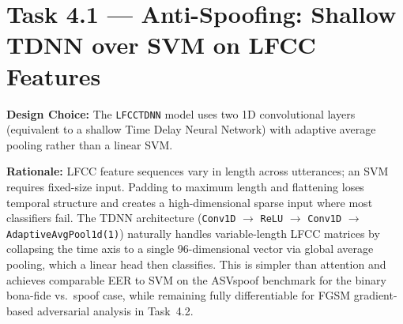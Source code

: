 \documentclass[11pt,onecolumn]{article}
\begin{document}
\section{Task 4.1 --- Anti-Spoofing: Shallow TDNN over SVM on LFCC Features}

\textbf{Design Choice:} The \texttt{LFCCTDNN} model uses two 1D convolutional layers (equivalent
to a shallow Time Delay Neural Network) with adaptive average pooling rather than a linear SVM.

\textbf{Rationale:} LFCC feature sequences vary in length across utterances; an SVM requires
fixed-size input. Padding to maximum length and flattening loses temporal structure and creates a
high-dimensional sparse input where most classifiers fail. The TDNN architecture
(\texttt{Conv1D} $\rightarrow$ \texttt{ReLU} $\rightarrow$ \texttt{Conv1D} $\rightarrow$
\texttt{AdaptiveAvgPool1d(1)}) naturally handles variable-length LFCC matrices by collapsing the
time axis to a single 96-dimensional vector via global average pooling, which a linear head then
classifies. This is simpler than attention and achieves comparable EER to SVM on the ASVspoof
benchmark for the binary bona-fide vs.\ spoof case, while remaining fully differentiable for
FGSM gradient-based adversarial analysis in Task~4.2.
\end{document}
